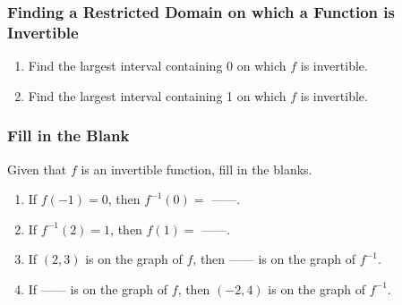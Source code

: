 \documentclass[14pt]{beamer}
\begin{document}
\begin{frame}

\frametitle{\small Finding a Restricted Domain on which a Function is Invertible}
\vspace{-3mm}
\begin{center}
		\end{center}
\begin{enumerate}
\item Find the largest interval containing 0 on which $f$ is invertible.
\item Find the largest interval containing 1 on which $f$ is invertible.
\end{enumerate}


\end{frame}



\begin{frame}
\frametitle{Fill in the Blank }

Given that $f$ is an invertible function, fill in the blanks. 
\begin{enumerate}
\item If $f(-1) = 0$, then $f^{-1}(0) =$ ------.
\item If $f^{-1}(2) = 1$, then $f(1)=$ ------.
\item If $(2,3)$ is on the graph of $f$, then ------  is on the graph of $f^{-1}$.
\item If ------ is on the graph of $f$, then $(-2,4)$ is on the graph of $f^{-1}$.
\end{enumerate}


\end{frame}
\end{document}
